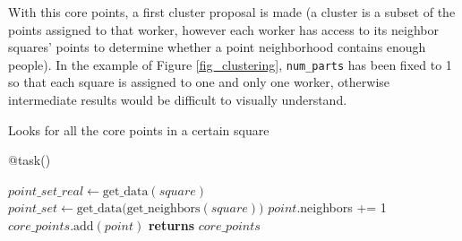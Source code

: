\documentclass[10pt,journal,compsoc]{IEEEtran}
\let\MYoriglatexcaption\caption
\renewcommand{\caption}[2][\relax]{\MYoriglatexcaption[#2]{#2}}
\begin{document}
With this core points, a first cluster proposal is made (a cluster is a subset of the points assigned to that worker, however each worker has access to its neighbor squares' points to determine whether a point neighborhood contains enough people). In the example of Figure \ref{fig_clustering}, \texttt{num\_parts} has been fixed to 1 so that each square is assigned to one and only one worker, otherwise intermediate results would be difficult to visually understand.
\begin{algorithm}
  \caption{Looks for all the core points in a certain square\label{alg:partialScan}}
  \begin{algorithmic}[1]
  	\State @task()
            \State {} 
		\State $point\_set\_real \gets \text{get\_data}(square)$ 
        \State $point\_set \gets \text{get\_data(get\_neighbors}(square))$
                	\State $point$.neighbors += 1
                \EndIf
      		\EndFor
            	\State $core\_points\text{.add}(point)$
          	\EndIf
     	\EndFor
        \State \textbf{returns} $core\_points$
    \EndFunction
  \end{algorithmic}
\end{algorithm}
\end{document}
